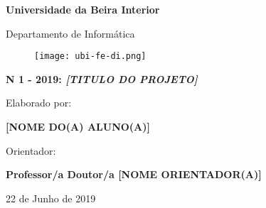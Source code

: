 
\thispagestyle{empty}
\setcounter{page}{-1}

\begin{center}
\begin{Huge}
\textbf{Universidade da Beira Interior}
\end{Huge}
\end{center}

\begin{center}
\begin{Huge}
Departamento de Informática
\end{Huge}
\end{center}

\vspace{0,07cm}
\begin{figure}[!htb]
\centering
\texttt{[image: ubi-fe-di.png]}
\end{figure}

\vspace{0.5cm}
\begin{center}
\begin{Large}
\textbf{N\textordmasculine{} 1 - 2019: \emph{[TITULO DO PROJETO]}}
\end{Large}
\end{center}


\vspace{0.5cm}
\begin{center}
\begin{normalsize}
\begin{large}
Elaborado por:
\end{large}
\end{normalsize}
\end{center}

\vspace{0.2cm}
\begin{center}
\begin{large}
\textbf{[NOME DO(A) ALUNO(A)]}
\end{large}
\end{center}

\vspace{0,5cm}
\begin{center}
\begin{normalsize}
\begin{large}
Orientador:
\end{large}
\end{normalsize}
\end{center}

\vspace{0.2cm}
\begin{center}
\begin{large}
\textbf{Professor/a Doutor/a [NOME ORIENTADOR(A)]}
\end{large}
\end{center}



\vspace{0.5cm}
\begin{center}
\begin{normalsize}
22 de Junho de 2019
\end{normalsize}
\end{center}
